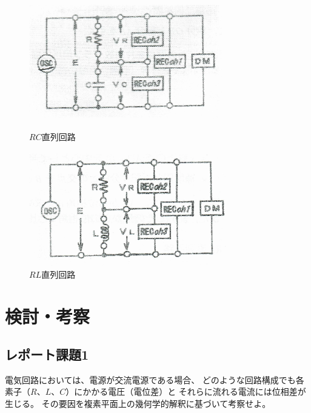 \documentclass[12pt]{jarticle}
\begin{document}
\begin{figure}[t]
    \begin{minipage}{0.5\hsize}
        \begin{center}
            \includegraphics[bb=0 0 1770 1054,height=5cm]{report3_fig3.27.jpg}
        \end{center}
        \caption{$RC$直列回路}
        \label{fig4}
    \end{minipage}
    \begin{minipage}{0.5\hsize}
        \begin{center}
            \includegraphics[bb=0 0 1745 1018,height=5cm]{report3_fig3.28.jpg}
        \end{center}
        \caption{$RL$直列回路}
        \label{fig5}
    \end{minipage}
\end{figure}

\clearpage

\section{検討・考察}
\subsection{レポート課題1}
\begin{shadebox}
    電気回路においては、電源が交流電源である場合、
    どのような回路構成でも各素子（$R$、$L$、$C$）にかかる電圧（電位差）と
    それらに流れる電流には位相差が生じる。
    その要因を複素平面上の幾何学的解釈に基づいて考察せよ。
\end{shadebox}
\end{document}
